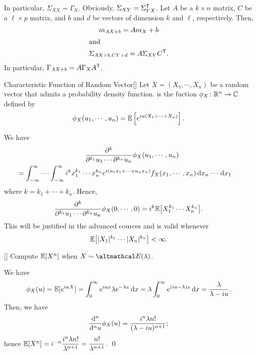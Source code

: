 \documentclass[../probability.tex]{subfiles}
\begin{document}
\begin{note}
    \begin{itemize}
        \ii
        In particular, \(\Sigma_{XX} = \Gamma_X\).
        \ii
        Obviously, \(\Sigma_{XY} = \Sigma_{YX}^{\mathsf{T}}\).
        \ii
        Let \(A\) be a \(k \times n\) matrix, \(C\) be a \(\ell \times p\) matrix,
        and \(b\) and \(d\) be vectors of dimension \(k\) and \(\ell\), respectively.
        Then,
        \begin{gather*}
            m_{AX+b} = Am_X + b \\
            \shortintertext{and}
            \Sigma_{AX+b, CY+d} = A \Sigma_{XY} C^{\mathsf{T}}\text.
        \end{gather*}
        In particular, \(\Gamma_{AX+b} = A\Gamma_X A^{\mathsf{T}}\).
    \end{itemize}
\end{note}

\begin{Definition}{Characteristic Function of Random Vector}[]
    Let \(X = (X_1, \cdots, X_n)\) be a random vector
    that admits a probability density function.
    is the fuction \(\phi_X \colon \RR^n \to \CC\) defined by
    \[
        \phi_X(u_1, \cdots, u_n) = \mathbb{E}\left[ e^{iu(X_1+\cdots+X_n)} \right]\text.
    \]
\end{Definition}

\begin{note}
    We have
    \begin{multline*}
        \quad\frac{\partial^k}{\partial^{k_1} u_1 \cdots \partial^{k_n}u_n} \phi_X(u_1, \cdots, u_n) \\
        = \int_{-\infty}^{\infty} \cdots \int_{-\infty}^{\infty}
        i^k x_1^{k_1} \cdots x_n^{k_n} e^{i(u_1 x_1 + \cdots + u_n x_n)}
        f_X(x_1, \cdots, x_n) \,\mathrm{d} x_n \cdots \,\mathrm{d} x_1\quad
    \end{multline*}
    where \(k = k_1 + \cdots + k_n\). Hence,
    \[
        \frac{\partial^k}{\partial^{k_1} u_1 \cdots \partial^{k_n}u_n} \phi_X(0, \cdots, 0)
        = i^k \mathbb{E}\bigl[X_1^{k_1} \cdots X_n^{k_n}\bigr]\text.
    \]
    This will be justified in the advanced cources and is valid whenever
    \[
        \mathbb{E}\bigl[|X_1|^{k_1} \cdots |X_n|^{k_n}\bigr] < \infty\text.
    \]
\end{note}

\begin{Exercise}{}[]
    Compute \(\mathbb{E}[X^n]\) when \(X \sim \mcal{E}(\lambda)\).
\end{Exercise}
\begin{solution}
    We have
    \[
        \phi_X(u) = \mathbb{E}[e^{iuX}] = \int_0^\infty e^{iu x} \lambda e^{-\lambda x} \,\mathrm{d} x
        = \lambda \int_0^\infty e^{(iu-\lambda)x} \,\mathrm{d} x
        = \frac{\lambda}{\lambda-iu}\text.
    \]
    Then, we have
    \[
        \frac{\mathrm{d}^n}{\mathrm{d}^n u}\phi_X(u) = \frac{i^n \lambda n!}{(\lambda - iu)^{n+1}}\text;
    \]
    hence \(\mathbb{E}[X^n] = i^{-n}\dfrac{i^n\lambda n!}{\lambda^{n+1}} = \dfrac{n!}{\lambda^{n+1}}\).
    \qed
\end{solution}
\end{document}
